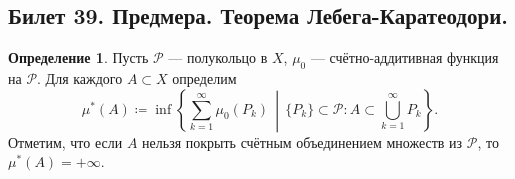 \documentclass[a4paper]{article}
\theoremstyle{indented}
\theoremstyle{definition}
\newtheorem{defn}{Определение}
\theoremstyle{remark}
\begin{document}
\subsection{Билет 39. Предмера. Теорема Лебега-Каратеодори.}

\begin{defn}
	Пусть $ \mathcal{P} $ --- полукольцо в $ X $, $ \mu_0 $ --- счётно-аддитивная функция на $ \mathcal{P} $. Для каждого $ A\subset X $ определим
	\begin{equation}\label{eq:9}
		\mu^*(A)\coloneqq\inf\left\{\sum_{k=1}^{\infty}\mu_0(P_k)\,\middle|\,\{P_k\}\subset \mathcal{P} : A\subset \bigcup_{k=1}^{\infty}P_k\right\}.
	\end{equation}
	Отметим, что если $ A $ нельзя покрыть счётным объединением множеств из $ \mathcal{P} $, то $ \mu^*(A)=+\infty $.
\end{defn}
\end{document}
